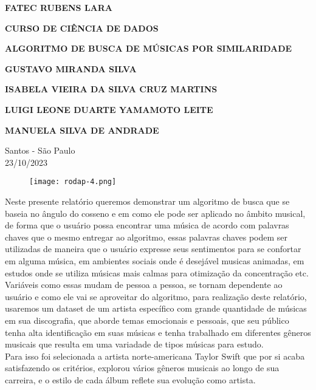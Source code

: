 \documentclass[a4paper,12pt]{article}
\begin{document}
\begin{center}
\textbf{FATEC RUBENS LARA}

\textbf{CURSO DE CIÊNCIA DE DADOS}

\vspace{3cm}

\textbf{ALGORITMO DE BUSCA DE MÚSICAS POR SIMILARIDADE}

\vspace{3cm}

\textbf{GUSTAVO MIRANDA SILVA}

\textbf{ISABELA VIEIRA DA SILVA CRUZ MARTINS}

\textbf{LUIGI LEONE DUARTE YAMAMOTO LEITE}

\textbf{MANUELA SILVA DE ANDRADE}

\vfill

\begin{flushright}
Santos - São Paulo\\
23/10/2023
\end{flushright}
\end{center}

\begin{figure}{}
\centering
\label{}
\texttt{[image: rodap-4.png]}
\end{figure}

\clearpage

Neste presente relatório queremos demonstrar um algoritmo de busca que se baseia no ângulo do cosseno e em como ele pode ser aplicado no âmbito musical, de forma que o usuário possa encontrar uma música de acordo com palavras chaves que o mesmo entregar ao algoritmo, essas palavras chaves podem ser utilizadas de maneira que o usuário expresse seus sentimentos para se confortar em alguma música, em ambientes sociais onde é desejável musicas animadas, em estudos onde se utiliza músicas mais calmas para otimização da concentração etc.\\

Variáveis como essas mudam de pessoa a pessoa, se tornam dependente ao usuário e como ele vai se aproveitar do algoritmo, para realização deste relatório, usaremos um dataset de um artista específico com grande quantidade de músicas em sua discografia, que aborde temas emocionais e pessoais, que seu público tenha alta identificação em suas músicas e tenha trabalhado em diferentes gêneros musicais que resulta em uma variadade de tipos músicas para estudo.\\

Para isso foi selecionada a artista norte-americana Taylor Swift que por si acaba satisfazendo os critérios, explorou vários gêneros musicais ao longo de sua carreira, e o estilo de cada álbum reflete sua evolução como artista.\\ 
\end{document}
